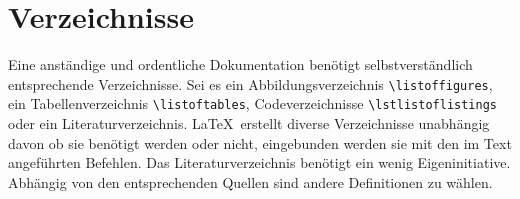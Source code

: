 \section{Verzeichnisse}
Eine anständige und ordentliche Dokumentation benötigt selbstverständlich entsprechende Verzeichnisse. Sei es ein Abbildungsverzeichnis \verb|\listoffigures|, ein Tabellenverzeichnis \verb|\listoftables|, Codeverzeichnisse \verb|\lstlistoflistings| oder ein Literaturverzeichnis. \LaTeX~erstellt diverse Verzeichnisse unabhängig davon ob sie benötigt werden oder nicht, eingebunden werden sie mit den im Text angeführten Befehlen. Das Literaturverzeichnis benötigt ein wenig Eigeninitiative. Abhängig von den entsprechenden Quellen sind andere Definitionen zu wählen.